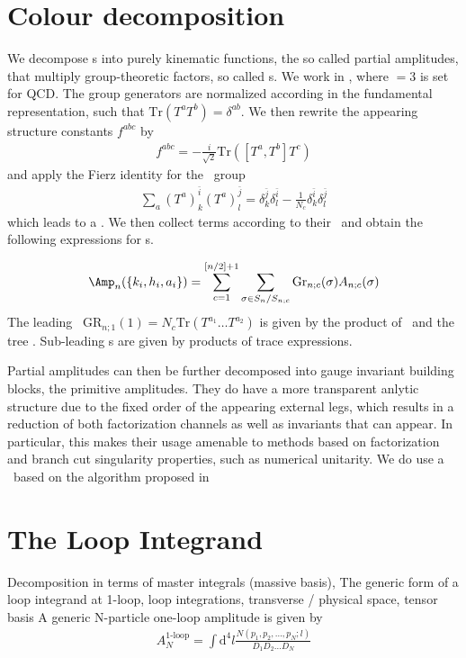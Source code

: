 \section{Colour decomposition}
We decompose \ola s into purely kinematic functions, the so called partial amplitudes, that multiply group-theoretic factors, so called \cf s. We work in \SNc, where \Nc$=3$ is set for QCD. The group generators are normalized according in the fundamental representation, such that $\text{Tr}(T^aT^b) = \delta^{ab}$. We then rewrite the appearing structure constants $f^{abc}$ by 
\begin{align}
f^{abc} = - \frac{i}{\sqrt{2}}\text{Tr}\left([T^a,T^b]T^c\right)
\end{align}
and apply the Fierz identity for the \SNc~group
\begin{align}
\sum_a (T^a)_k^{\bar i} (T^a)_l^{\bar j} = \delta_k^{\bar j} \delta_l^{\bar i} - \frac{1}{N_c}  \delta_k^{\bar i} \delta_l^{\bar j} 
\end{align}
which leads to a \cd. We then collect terms according to their \cf~and obtain the following expressions for \ola s.

\begin{align}
\Amp_n (\{k_i,h_i,a_i\}) = \sum_{c=1}^{[n/2]+1}\sum_{\sigma \in S_n/S_{n;c}} \text{Gr}_{n;c}(\sigma)A_{n;c}(\sigma)
\end{align}
The leading \cf~GR$_{n;1}(1)=N_c \text{Tr}(T^{a_1}\dots T^{a_2})$ is given by the product of \Nc~and the tree \cf. Sub-leading \cs s are given by products of trace expressions.

Partial amplitudes can then be further decomposed into gauge invariant
building blocks, the primitive amplitudes. They do have a more
transparent anlytic structure due to the fixed order of the appearing
external legs, which results in a reduction of both factorization
channels as well as invariants that can appear. In particular, this
makes their usage amenable to methods based on factorization and
branch cut singularity properties, such as numerical unitarity. We do
use a \cd~based on the algorithm proposed in \cite{Ita:2011arx}


\section{The Loop Integrand}

Decomposition in terms of master integrals (massive basis), The generic form of a loop integrand at 1-loop, loop integrations,
transverse / physical space, tensor basis
A generic N-particle one-loop amplitude is given by
\begin{align}
 A_N^{\text{1-loop}}= \int \text{d}^4 l
 \frac{N(p_1,p_2,\dots,p_N;l)}{D_1D_2\dots D_N}
\end{align}

